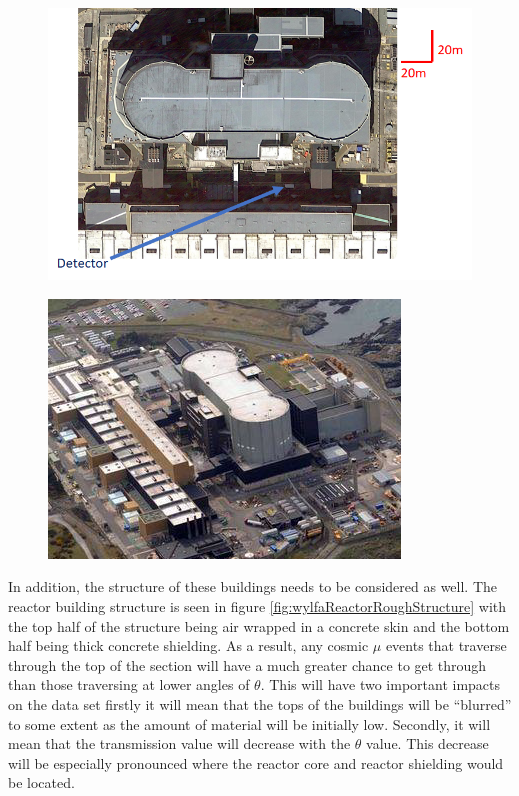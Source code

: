 \begin{figure}[!h]
 \centering
 \includegraphics[width=0.75\linewidth]{Chapter5/Figs/wylfaRasterNew/DetectorPositionTopDown.png}
 \label{fig:DetectorPositionTopDown}
\end{figure}

\begin{figure}[!h]
 \centering
 \includegraphics[width=0.6\linewidth]{Chapter5/Figs/Raster/wylfaArielView.png}
 \label{fig:wylfaAir}
\end{figure}

In addition, the structure of these buildings needs to be considered as well. The reactor building structure is seen in figure \ref{fig:wylfaReactorRoughStructure} with the top half of the structure being air wrapped in a concrete skin and the bottom half being thick concrete shielding. As a result, any cosmic $\mu$ events that traverse through the top of the section will have a much greater chance to get through than those traversing at lower angles of $\theta$. This will have two important impacts on the data set firstly it will mean that the tops of the buildings will be ``blurred'' to some extent as the amount of material will be initially low. Secondly, it will mean that the transmission value will decrease with the $\theta$ value. This decrease will be especially pronounced where the reactor core and reactor shielding would be located. 

